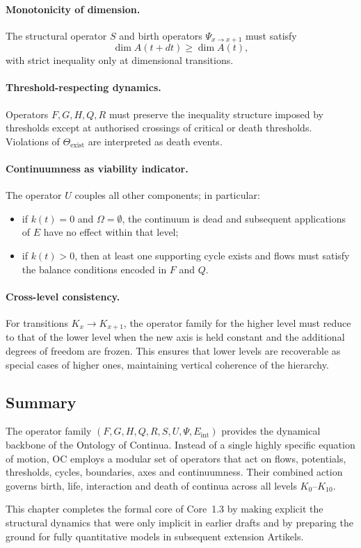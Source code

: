 \paragraph{Monotonicity of dimension.}
The structural operator \(S\) and birth operators \(\Psi_{x\to x+1}\) must
satisfy
\[
  \dim A(t+dt) \ge \dim A(t),
\]
with strict inequality only at dimensional transitions.

\paragraph{Threshold-respecting dynamics.}
Operators \(F, G, H, Q, R\) must preserve the inequality structure imposed by
thresholds except at authorised crossings of critical or death thresholds.
Violations of \(\Theta_{\mathrm{exist}}\) are interpreted as death events.

\paragraph{Continuumness as viability indicator.}
The operator \(U\) couples all other components; in particular:
\begin{itemize}
  \item if \(k(t) = 0\) and \(\Omega = \emptyset\), the continuum is dead and
        subsequent applications of \(E\) have no effect within that level;
  \item if \(k(t) > 0\), then at least one supporting cycle exists and flows
        must satisfy the balance conditions encoded in \(F\) and \(Q\).
\end{itemize}

\paragraph{Cross-level consistency.}
For transitions \(K_x \to K_{x+1}\), the operator family for the higher level
must reduce to that of the lower level when the new axis is held constant and
the additional degrees of freedom are frozen. This ensures that lower levels
are recoverable as special cases of higher ones, maintaining vertical
coherence of the hierarchy.

\subsection{Summary}

The operator family \((F, G, H, Q, R, S, U, \Psi, E_{\mathrm{int}})\) provides
the dynamical backbone of the Ontology of Continua. Instead of a single
highly specific equation of motion, OC employs a modular set of operators that
act on flows, potentials, thresholds, cycles, boundaries, axes and
continuumness. Their combined action governs birth, life, interaction and
death of continua across all levels \(K_0\)–\(K_{10}\).

This chapter completes the formal core of Core~1.3 by making explicit the
structural dynamics that were only implicit in earlier drafts and by preparing
the ground for fully quantitative models in subsequent extension Artikels.
